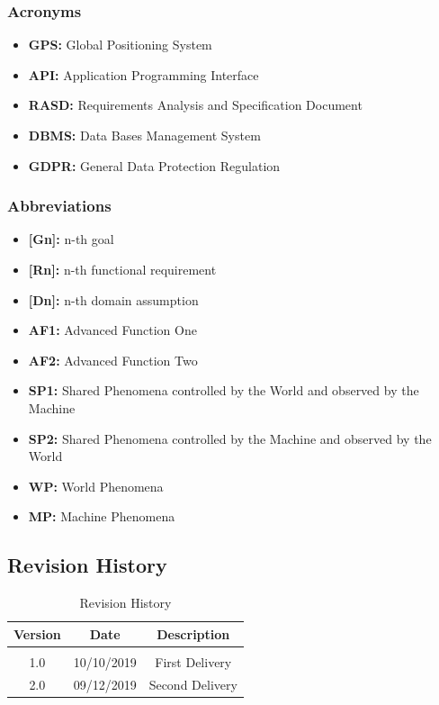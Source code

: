 \documentclass {article}
\begin{document}
		\subsubsection{Acronyms}
		
			\begin{itemize}
				\item {\bf GPS:} Global Positioning System
				\item {\bf API:} Application Programming Interface
				\item {\bf RASD:} Requirements Analysis and 								Specification Document
				\item {\bf DBMS:} Data Bases Management System
				\item {\bf GDPR:} General Data Protection Regulation
			\end{itemize}

				
				
		\subsubsection{Abbreviations}
		
			\begin{itemize}
				\item {\bf [Gn]:} n-th goal
				\item {\bf [Rn]:} n-th functional requirement
				\item {\bf [Dn]:} n-th domain assumption
				\item {\bf AF1:} Advanced Function One
				\item {\bf AF2:} Advanced Function Two
				\item {\bf SP1:} Shared Phenomena controlled by the 	World and observed by the Machine
				\item {\bf SP2:} Shared Phenomena controlled by the 	Machine and observed by the World
				\item {\bf WP:} World Phenomena
				\item {\bf MP:} Machine Phenomena
			\end{itemize}
			
			\pagebreak
			
		\subsection{Revision History}
	
		\begin{table}[ht]
			\centering
			\begin{tabular}{ccc} 
			Version & Date & Description  \\ 
			\hline
		 	\\1.0 & 10/10/2019 & First Delivery
		 	\\2.0 & 09/12/2019 & Second Delivery
			\end{tabular}
		\caption{Revision History}
		\label{default}
		\end{table}	
		
\end{document}
